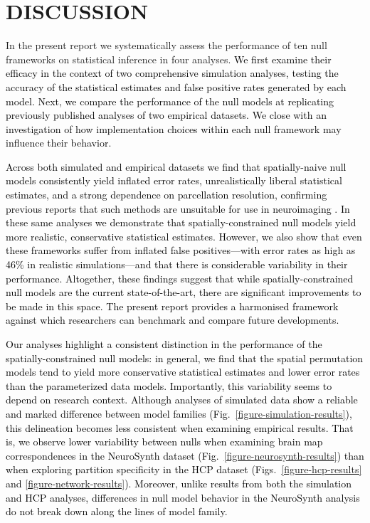\documentclass[12pt,aps,pra,reprint,showkeys]{revtex4-1}
\newcommand{\nimg}[1]{\textcolor{black}{{#1}}}
\begin{document}
\section*{DISCUSSION}

In the present report we systematically assess the performance of ten null frameworks on statistical inference in four analyses.
\nimg{We first examine their efficacy in the context of two comprehensive simulation analyses, testing the accuracy of the statistical estimates and false positive rates generated by each model.
Next, we compare the performance of the null models at replicating previously published analyses of two empirical datasets.
We close with an investigation of how implementation choices within each null framework may influence their behavior.}

\nimg{Across both simulated and empirical datasets we find that spatially-naive null models consistently yield inflated error rates, unrealistically liberal statistical estimates, and a strong dependence on parcellation resolution, confirming previous reports that such methods are unsuitable for use in neuroimaging \citep{alexanderbloch2018neuroimage, burt2020neuroimage}.
In these same analyses we demonstrate that spatially-constrained null models yield more realistic, conservative statistical estimates.
However, we also show that even these frameworks suffer from inflated false positives---with error rates as high as 46\% in realistic simulations---and that there is considerable variability in their performance.
Altogether, these findings suggest that while spatially-constrained null models are the current state-of-the-art, there are significant improvements to be made in this space.
The present report provides a harmonised framework against which researchers can benchmark and compare future developments.}

\nimg{Our analyses highlight a consistent distinction in the performance of the spatially-constrained null models: in general, we find that the spatial permutation models tend to yield more conservative statistical estimates and lower error rates than the parameterized data models.
Importantly, this variability seems to depend on research context.
Although analyses of simulated data show a reliable and marked difference between model families (Fig.~\ref{figure-simulation-results}), this delineation becomes less consistent when examining empirical results.
That is, we observe lower variability between nulls when examining brain map correspondences in the NeuroSynth dataset (Fig.~\ref{figure-neurosynth-results}) than when exploring partition specificity in the HCP dataset (Figs.~\ref{figure-hcp-results} and \ref{figure-network-results}).
Moreover, unlike results from both the simulation and HCP analyses, differences in null model behavior in the NeuroSynth analysis do not break down along the lines of model family.}
\end{document}
